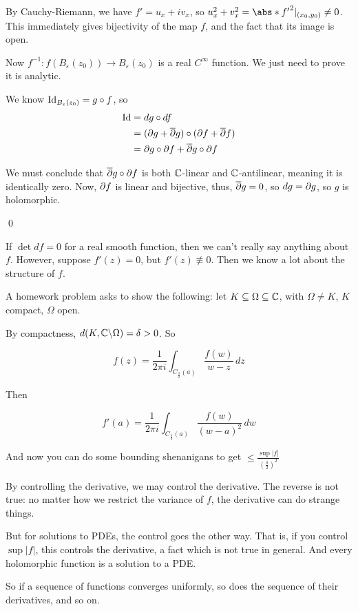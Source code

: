 \documentclass[x11names,reqno,14pt]{extarticle}
\newcommand{\oo}{{\infty}}
\begin{document}
By Cauchy-Riemann, we have $f' = u_x + iv_x$, so $u_x^2 + v_x^2 = \abs*{f'}^2|_{(x_0, y_0)} \neq 0$. This immediately gives bijectivity of the map $f$, and the fact that its image is open.

Now $f^{-1}:f(B_{\varepsilon}(z_0))\to B_{\varepsilon}(z_0)$ is a real $C^\oo$ function. We just need to prove it is analytic. 

We know $\operatorname{\mathrm{Id}}_{B_{\varepsilon}(z_0)} = g \circ f$, so 
\begin{align*}
\operatorname{\mathrm{Id}} & = dg \circ df \\
	 & =(\partial g + \overline{\partial}g)\circ(\partial f + \overline{\partial} f) \\
	 & = \partial g \circ \partial f + \overline{\partial}g \circ \partial f \\
\end{align*}

We must conclude that $\overline{\partial}g \circ \partial f$ is both $\mathbb{C}$-linear and $\mathbb{C}$-antilinear, meaning it is identically zero. Now, $\partial f$ is linear and bijective, thus, $\overline{\partial}g = 0$, so $dg = \partial g$, so $g$ is holomorphic. 

\qed

If $\det df = 0$ for a real smooth function, then we can't really say anything about $f$. However, suppose $f'(z) = 0$, but $f'(z) \not\equiv 0$. Then we know a lot about the structure of $f$. 

A homework problem asks to show the following: let $K \subseteq \Omega \subseteq \mathbb{C}$, with $\Omega\neq K$, $K$ compact, $\Omega$ open.

 By compactness, $d(K, \mathbb{C}\backslash\Omega) = \delta > 0$. So 

\[
f(z) = \frac{1}{2\pi i}\int_{C_{\frac{\delta}{2}}(a)}\frac{f(w)}{w - z}\,dz
\]

Then 

\[
f'(a) = \frac{1}{2\pi i}\int_{C_{\frac{\delta}{2}}(a)}\frac{f(w)}{(w - a)^2}\,dw
\]

And now you can do some bounding shenanigans to get $\leq \frac{\sup |f|}{(\frac{\delta}{2})^2}$

By controlling the derivative, we may control the derivative. The reverse is not true: no matter how we restrict the variance of $f$, the derivative can do strange things. 

But for solutions to PDEs, the control goes the other way. That is, if you control $\sup|f|$, this controls the derivative, a fact which is not true in general. And every holomorphic function is a solution to a PDE.

So if a sequence of functions converges uniformly, so does the sequence of their derivatives, and so on. 
\end{document}
